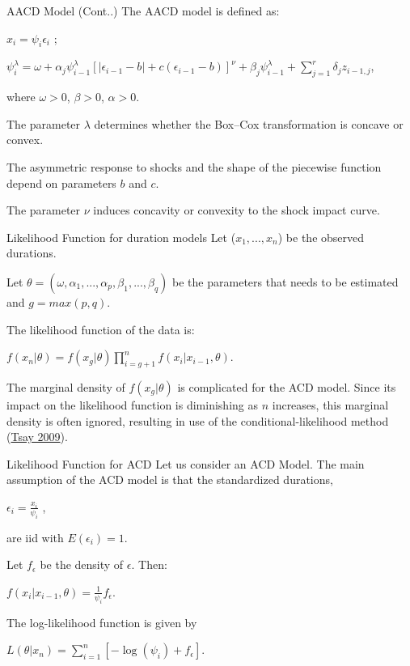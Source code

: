 \documentclass[
  ignorenonframetext,
]{beamer}
\begin{document}
\begin{frame}{AACD Model (Cont..)}
\protect\hypertarget{aacd-model-cont..}{}
The AACD model is defined as:

\(x_i=\psi_i\epsilon_i\) ;

\(\psi_i^{\lambda}=\omega+\alpha_j\psi_{i-1}^{\lambda}[|\epsilon_{i-1}-b|+c(\epsilon_{i-1}-b)]^{\nu}+\beta_j\psi_{i-1}^{\lambda}+\sum_{j=1}^r\delta_jz_{i-1,j}\),

where \(\omega > 0\), \(\beta > 0\), \(\alpha > 0\).

The parameter \(\lambda\) determines whether the Box--Cox transformation
is concave or convex.

The asymmetric response to shocks and the shape of the piecewise
function depend on parameters \(b\) and \(c\).

The parameter \(\nu\) induces concavity or convexity to the shock impact
curve.
\end{frame}

\begin{frame}{Likelihood Function for duration models}
\protect\hypertarget{likelihood-function-for-duration-models}{}
Let (\(x_1,...,x_n\)) be the observed durations.

Let \(\theta=(\omega, \alpha_1, ..., \alpha_p, \beta_1,..., \beta_q)\)
be the parameters that needs to be estimated and \(g = max(p, q)\).

The likelihood function of the data is:

\(f(x_n|\theta)=f(x_g|\theta)\prod_{i=g+1}^nf(x_i|x_{i-1},\theta)\).

The marginal density of \(f(x_g|\theta)\) is complicated for the ACD
model. Since its impact on the likelihood function is diminishing as
\(n\) increases, this marginal density is often ignored, resulting in
use of the conditional-likelihood method
(\protect\hyperlink{ref-ACDtext}{Tsay 2009}).
\end{frame}

\begin{frame}{Likelihood Function for ACD}
\protect\hypertarget{likelihood-function-for-acd}{}
Let us consider an ACD Model. The main assumption of the ACD model is
that the standardized durations,

\(\epsilon_i=\frac{x_i}{\psi_i}\) ,

are iid with \(E(\epsilon_i)=1\).

Let \(f_{\epsilon}\) be the density of \(\epsilon\). Then:

\(f(x_i|x_{i-1},\theta)=\frac{1}{\psi_i}f_{\epsilon}\).

The log-likelihood function is given by

\(L(\theta|x_n)=\sum_{i=1}^n[-\log(\psi_i)+f_{\epsilon}]\).
\end{frame}
\end{document}
